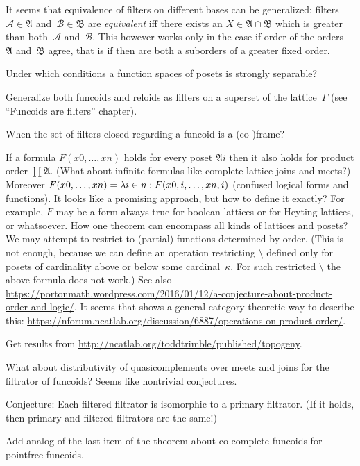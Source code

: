 \documentclass{amsart}
\begin{document}
It seems that equivalence of filters on different bases can be generalized:
filters~$\mathcal{A}\in\mathfrak{A}$ and~$\mathcal{B}\in\mathfrak{B}$ are \emph{equivalent} iff
there exists an $X\in\mathfrak{A}\cap\mathfrak{B}$ which is greater than both~$\mathcal{A}$ and~$\mathcal{B}$.
This however works only in the case if order of the orders~$\mathfrak{A}$ and~$\mathfrak{B}$ agree,
that is if then are both a suborders of a greater fixed order.

Under which conditions a function spaces of posets is strongly separable?

Generalize both funcoids and reloids as filters on a superset of the lattice~$\Gamma$ (see ``Funcoids are filters'' chapter).

When the set of filters closed regarding a funcoid is a (co-)frame?

If a formula $F(x 0,\dots,x n)$ holds for every poset $\mathfrak{A} i$ then it also holds for product order $\prod\mathfrak{A}$.
(What about infinite formulas like complete lattice joins and meets?)
Moreover $F(x 0,\dots,x n) = \lambda i\in n:F(x {0,i},\dots,x {n,i})$ (confused logical forms and functions).
It looks like a promising approach, but how to define it exactly? For example, $F$ may be a form always true for boolean
lattices or for Heyting lattices, or whatsoever. How one theorem can encompass all kinds of lattices and posets?
We may attempt to restrict to (partial) functions determined by order.
(This is not enough, because we can define an operation restricting $\setminus$ defined only for posets
of cardinality above or below some cardinal~$\kappa$. For such restricted $\setminus$ the above formula does not work.)
See also \url{https://portonmath.wordpress.com/2016/01/12/a-conjecture-about-product-order-and-logic/}.
It seems that  shows a general category-theoretic way to describe this:
\url{https://nforum.ncatlab.org/discussion/6887/operations-on-product-order/}.

Get results from \url{http://ncatlab.org/toddtrimble/published/topogeny}.

What about distributivity of quasicomplements over meets and joins for the filtrator of funcoids? Seems like nontrivial conjectures.

Conjecture: Each filtered filtrator is isomorphic to a primary filtrator. (If it holds, then primary and filtered filtrators are the same!)

Add analog of the last item of the theorem about co-complete funcoids for pointfree funcoids.
\end{document}
